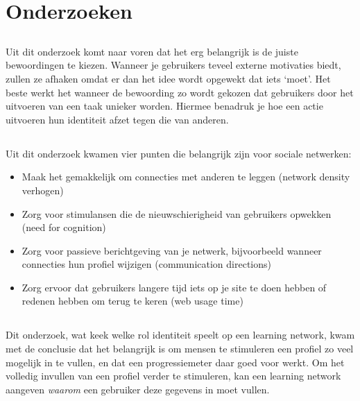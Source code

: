 \documentclass[a4paper, 10pt, pdftex]{report}
\begin{document}
    \section{Onderzoeken}
      \subsection{\cite{Beenen2004}}
      Uit dit onderzoek komt naar voren dat het erg belangrijk is de juiste bewoordingen te kiezen. Wanneer je gebruikers teveel externe motivaties biedt, zullen ze afhaken omdat er dan het idee wordt opgewekt dat iets `moet'. Het beste werkt het wanneer de bewoording zo wordt gekozen dat gebruikers door het uitvoeren van een taak unieker worden. Hiermee benadruk je hoe een actie uitvoeren hun identiteit afzet tegen die van anderen.

      \subsection{\cite{Sohn2005}}
        Uit dit onderzoek kwamen vier punten die belangrijk zijn voor sociale netwerken:
        \begin{itemize}
          \item Maak het gemakkelijk om connecties met anderen te leggen (network density verhogen)
          \item Zorg voor stimulansen die de nieuwschierigheid van gebruikers opwekken (need for cognition)
          \item Zorg voor passieve berichtgeving van je netwerk, bijvoorbeeld wanneer connecties hun profiel wijzigen (communication directions)
          \item Zorg ervoor dat gebruikers langere tijd iets op je site te doen hebben of redenen hebben om terug te keren (web usage time)
        \end{itemize}

      \subsection{\cite{Brouns2008}}
        Dit onderzoek, wat keek welke rol identiteit speelt op een learning network, kwam met de conclusie dat het belangrijk is om mensen te stimuleren een profiel zo veel mogelijk in te vullen, en dat een progressiemeter daar goed voor werkt. Om het volledig invullen van een profiel verder te stimuleren, kan een learning network aangeven \emph{waarom} een gebruiker deze gegevens in moet vullen.
\end{document}
